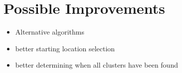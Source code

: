 
\section{Possible Improvements}
\label{sec:possible_improvements}


\begin{itemize}
	\item Alternative algorithms
	\item better starting location selection
	\item better determining when all clusters have been found
\end{itemize}
